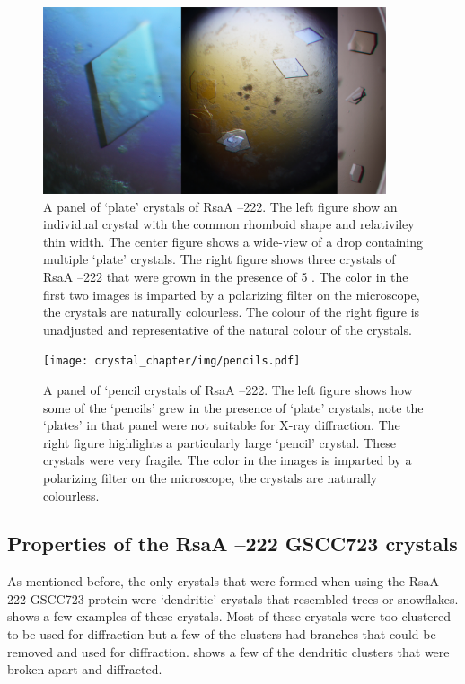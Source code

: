 \begin{figure}[p]
  	\begin{center}
   		\includegraphics[width=0.9\textwidth]{crystal_chapter/img/goodxtal.jpg}
   	\end{center}
   	\caption[Panel of well diffracting `plate' crystals of RsaA --222]{A panel of `plate' crystals of RsaA --222. The left figure show an individual crystal with the common rhomboid shape and relativiley thin width. The center figure shows a wide-view of a drop containing multiple `plate' crystals. The right figure shows three crystals of RsaA --222 that were grown in the presence of 5 \millimolar{} . The color in the first two images is imparted by a polarizing filter on the microscope, the crystals are naturally colourless. The colour of the right figure is unadjusted and representative of the natural colour of the crystals.}
   	\label{fig:crystal-panel}
\end{figure}   
\begin{figure}[p]
  	\begin{center}
   		\texttt{[image: crystal\_chapter/img/pencils.pdf]}
   	\end{center}
   	\caption[A panel of `pencil crystals of RsaA --222']{A panel of `pencil crystals of RsaA --222. The left figure shows how some of the `pencils' grew in the presence of `plate' crystals, note the `plates' in that panel were not suitable for X-ray diffraction. The right figure highlights a particularly large `pencil' crystal. These crystals were very fragile.  The color in the images is imparted by a polarizing filter on the microscope, the crystals are naturally colourless.} 
   	\label{fig:pencils}
\end{figure}   

\subsection{Properties of the RsaA --222 GSCC723 crystals}\label{sec:properties-rsaa-del}
As mentioned before, the only crystals that were formed when using the RsaA --222 GSCC723 protein were `dendritic' crystals that resembled trees or snowflakes.  shows a few examples of these crystals. Most of these crystals were too clustered to be used for diffraction but a few of the clusters had branches that could be removed and used for diffraction.  shows a few of the dendritic clusters that were broken apart and diffracted. 

